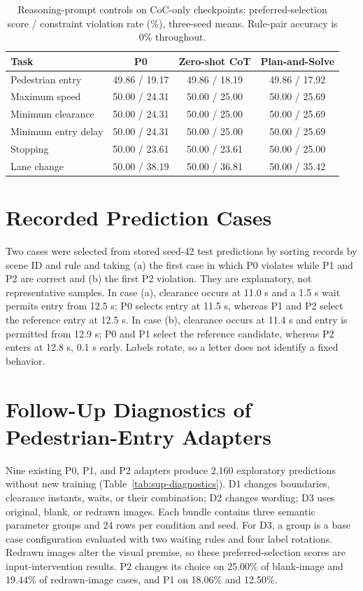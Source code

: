 \documentclass[10pt]{article}
\begin{document}
\begin{table}[h]
\centering\footnotesize
\caption{Reasoning-prompt controls on CoC-only checkpoints: preferred-selection score / constraint violation rate (\%), three-seed means. Rule-pair accuracy is 0\% throughout.}
\label{tab:sup-reasoning}
\begin{tabular}{lccc}
\toprule
Task & P0 & Zero-shot CoT & Plan-and-Solve\\
\midrule
Pedestrian entry & 49.86 / 19.17 & 49.86 / 18.19 & 49.86 / 17.92\\
Maximum speed & 50.00 / 24.31 & 50.00 / 25.00 & 50.00 / 25.69\\
Minimum clearance & 50.00 / 24.31 & 50.00 / 25.00 & 50.00 / 25.69\\
Minimum entry delay & 50.00 / 24.31 & 50.00 / 25.00 & 50.00 / 25.69\\
Stopping & 50.00 / 23.61 & 50.00 / 23.61 & 50.00 / 25.00\\
Lane change & 50.00 / 38.19 & 50.00 / 36.81 & 50.00 / 35.42\\
\bottomrule
\end{tabular}
\end{table}

\section{Recorded Prediction Cases}\label{sup:cases}

Two cases were selected from stored seed-42 test predictions by sorting records
by scene ID and rule and taking (a) the first case in which P0 violates while
P1 and P2 are correct and (b) the first P2 violation. They are explanatory,
not representative samples. In case (a), clearance occurs at 11.0 s and a 1.5 s
wait permits entry from 12.5 s; P0 selects entry at 11.5 s, whereas P1 and P2
select the reference entry at 12.5 s. In case (b), clearance occurs at 11.4 s
and entry is permitted from 12.9 s; P0 and P1 select the reference candidate,
whereas P2 enters at 12.8 s, 0.1 s early. Labels rotate, so a letter does not
identify a fixed behavior.

\section{Follow-Up Diagnostics of Pedestrian-Entry Adapters}\label{sup:diagnostics}

Nine existing P0, P1, and P2 adapters produce 2,160 exploratory predictions
without new training (Table~\ref{tab:sup-diagnostics}). D1 changes boundaries,
clearance instants, waits, or their combination; D2 changes wording; D3 uses
original, blank, or redrawn images. Each bundle contains three semantic
parameter groups and 24 rows per condition and seed. For D3, a group is a base
case configuration evaluated with two waiting rules and four label rotations.
Redrawn images alter the visual premise, so these preferred-selection scores
are input-intervention results. P2 changes its
choice on 25.00\% of blank-image and 19.44\% of redrawn-image cases, and P1 on
18.06\% and 12.50\%.
\end{document}
